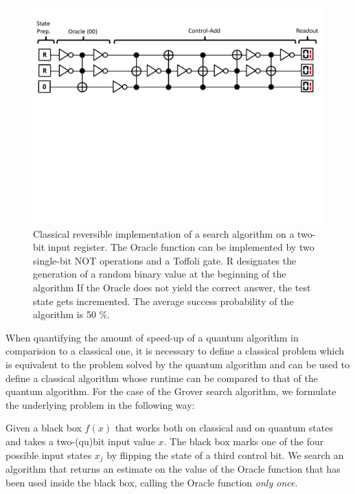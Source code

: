 \begin{figure}[ht!]
	\centering
		\includegraphics[width=1.0\textwidth]{"./material/papers/grover/classical_reversible_algorithm"}
	\caption{Classical reversible implementation of a search algorithm on a two-bit input register. The Oracle function can be implemented by two single-bit NOT operations and a Toffoli gate. R designates the generation of a random binary value at the beginning of the algorithm If the Oracle does not yield the correct answer, the test state gets incremented. The average success probability of the algorithm is 50 \%.}
	\label{fig:GroverClassicalReversibleAlgorithm}
\end{figure}

When quantifying the amount of speed-up of a quantum algorithm in comparision to a classical one, it is necessary to define a classical problem which is equivalent to the problem solved by the quantum algorithm and can be used to define a classical algorithm whose runtime can be compared to that of the quantum algorithm. For the case of the Grover search algorithm, we formulate the underlying problem in the following way:

\begin{theorem}
Given a black box $f(x)$ that works both on classical and on quantum states and takes a two-(qu)bit input value $x$. The black box marks one of the four possible input states $x_j$ by flipping the state of a third control bit. We search an algorithm that returns an estimate on the value of the Oracle function that has been used inside the black box, calling the Oracle function {\it only once}.
\end{theorem}

